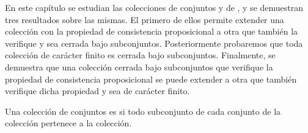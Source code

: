 %
\begin{isabellebody}%
%
%
\isadelimtheory
%
\endisadelimtheory
%
\isatagtheory
%
\endisatagtheory
{\isafoldtheory}%
%
\isadelimtheory
%
\endisadelimtheory
%
\begin{isamarkuptext}%
En este capítulo se estudian las colecciones de conjuntos  y de 
  , y se demuestran tres resultados sobre las mismas. El primero de ellos permite
  extender una colección con la propiedad de consistencia proposicional a otra que 
  también la verifique y sea cerrada bajo subconjuntos. Posteriormente probaremos que toda colección
  de carácter finito es cerrada bajo subconjuntos. Finalmente, se demuestra que una colección 
  cerrada bajo subconjuntos que verifique la propiedad de consistencia proposicional se puede 
  extender a otra que también verifique dicha propiedad y sea de carácter finito.

  \begin{definicion}
    Una colección de conjuntos es  si todo subconjunto de cada conjunto 
    de la colección pertenece a la colección.
  \end{definicion}


\end{isamarkuptext}
\end{isabellebody}
